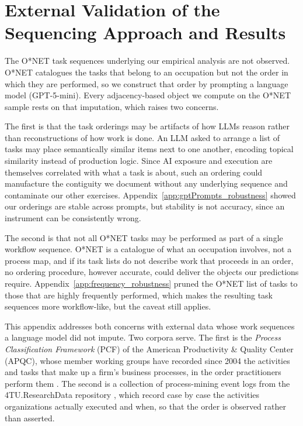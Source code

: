 \section{External Validation of the Sequencing Approach and Results}
\label{app:external_validation}

The O*NET task sequences underlying our empirical analysis are not observed.
O*NET catalogues the tasks that belong to an occupation but not the order in which they are performed, so we
construct that order by prompting a language model (GPT-5-mini).
Every adjacency-based object we compute on the O*NET sample rests on that imputation, which raises two concerns.

The first is that the task orderings may be artifacts of how LLMs reason rather than reconstructions of
how work is done.
An LLM asked to arrange a list of tasks may place semantically similar items next to one another, encoding
topical similarity instead of production logic.
Since AI exposure and execution are themselves correlated with what a task is about, such an ordering could manufacture the
contiguity we document without any underlying sequence and contaminate our other exercises.
Appendix~\ref{app:gptPrompts_robustness} showed our orderings are stable across prompts, but stability is
not accuracy, since an instrument can be consistently wrong.

The second is that not all O*NET tasks may be performed as part of a single workflow sequence.
O*NET is a catalogue of what an occupation involves, not a process map, and if its task lists do not describe
work that proceeds in an order, no ordering procedure, however accurate, could deliver the objects our predictions require.
Appendix~\ref{app:frequency_robustness} pruned the O*NET list of tasks to those that are highly frequently performed, which makes
the resulting task sequences more workflow-like, but the caveat still applies.

This appendix addresses both concerns with external data whose work sequences a language model did not impute.
Two corpora serve.
The first is the \emph{Process Classification Framework} (PCF) of the American Productivity \& Quality Center
(APQC), whose member working groups have recorded since 2004 the activities and tasks that make up a firm's
business processes, in the order practitioners perform them \citep{apqc_pcf}.
The second is a collection of process-mining event logs from the 4TU.ResearchData repository \citep{roadfines_log, sepsis_log, bpi2017_log, bpi2020_log}, which
record case by case the activities organizations actually executed and when, so that the order is observed
rather than asserted.

